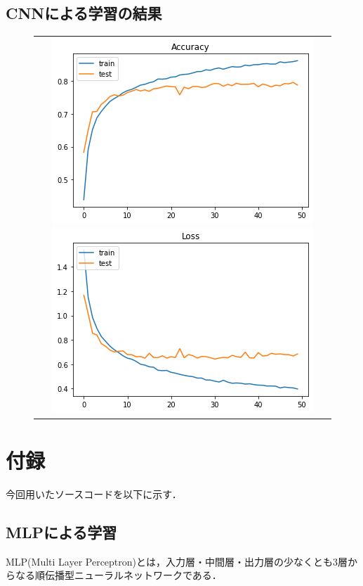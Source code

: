 \documentclass[a4paper, titlepage]{jsarticle}
\begin{document}
	\subsection{CNNによる学習の結果}
	\begin{figure}[ht]
		\begin{tabular}{c}
			\begin{minipage}{0.5\hsize}
				\centering
				\includegraphics[keepaspectratio, scale=0.45]{result2-1.png}
			\end{minipage}
			\begin{minipage}{0.5\hsize}
				\centering
				\includegraphics[keepaspectratio, scale=0.45]{result2-2.png}
			\end{minipage}
		\end{tabular}
	\end{figure}

	\section{付録}
	今回用いたソースコードを以下に示す．

	\subsection{MLPによる学習}
	MLP(Multi Layer Perceptron)とは，入力層・中間層・出力層の少なくとも3層からなる順伝播型ニューラルネットワークである．
	
\end{document}

